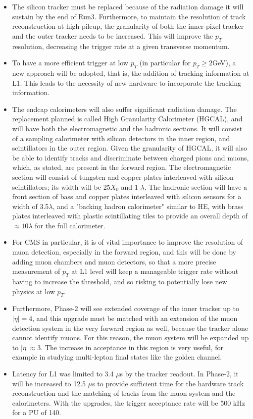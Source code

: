 \begin{itemize}
    \item The silicon tracker must be replaced because of the radiation damage it will sustain by the end of Run3. Furthermore, to maintain the resolution of track reconstruction at high pileup, the granularity of both the inner pixel tracker and the outer tracker needs to be increased. This will improve the $p_T$ resolution, decreasing the trigger rate at a given transverse momentum.
    \item To have a more efficient trigger at low $p_T$ (in particular for $p_T\geq 2$GeV), a new approach will be adopted, that is, the addition of tracking information at L1. This leads to the necessity of new hardware to incorporate the tracking information. 
    \item The endcap calorimeters will also suffer significant radiation damage. The replacement planned is called High Granularity Calorimeter (HGCAL), and will have both the electromagnetic and the hadronic sections. It will consist of a sampling calorimeter with silicon detectors in the inner region, and scintillators in the outer region. Given the granularity of HGCAL, it will also be able to identify tracks and discriminate between charged pions and muons, which, as stated, are present in the forward region. The electromagnetic section will consist of tungsten and copper plates interleaved with silicon scintillators; its width will be 25$X_0$ and 1 $\lambda$. The hadronic section will have a front section of bass and copper plates interleaved with silicon sensors for a width of 3.5$\lambda$, and a "backing hadron calorimeter" similar to HE, with brass plates interleaved with plastic scintillating tiles to provide an overall depth of $\approx10\lambda$ for the full calorimeter.
    \item For CMS in particular, it is of vital importance to improve the resolution of muon detection, especially in the forward region, and this will be done by adding muon chambers and muon detectors, so that a more precise measurement of $p_T$ at L1 level will keep a manageable trigger rate without having to increase the threshold, and so risking to potentially lose new physics at low $p_T$.
    \item Furthermore, Phase-2 will see extended coverage of the inner tracker up to $|\eta|=4$, and this upgrade must be matched with an extension of the muon detection system in the very forward region as well, because the tracker alone cannot identify muons. For this reason, the muon system will be expanded up to $|\eta| \approx 3$. The increase in acceptance in this region is very useful, for example in studying multi-lepton final states like the golden channel.
    \item Latency for L1 was limited to 3.4 $\mu$s by the tracker readout. In Phase-2, it will be increased to 12.5 $\mu$s to provide sufficient time for the hardware track reconstruction and the matching of tracks from the muon system and the calorimeters. With the upgrades, the trigger acceptance rate will be 500 kHz for a PU of 140.
\end{itemize}
